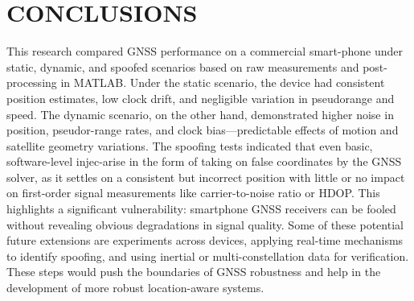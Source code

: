 
\section{CONCLUSIONS} \label{sec:conclusions}

    This research compared GNSS performance on a commercial smart-phone under static, dynamic, and spoofed scenarios based on raw measurements and post-processing in MATLAB. Under the static scenario, the device had consistent position estimates, low clock drift, and negligible variation in pseudorange and speed. The dynamic scenario, on the other hand, demonstrated higher noise in position, pseudor-range rates, and clock bias—predictable effects of motion and satellite geometry variations.
    The spoofing tests indicated that even basic, software-level injec-arise in the form of taking on false coordinates by the GNSS solver, as it settles on a consistent but incorrect position with little or no impact on first-order signal measurements like carrier-to-noise ratio or HDOP. This highlights a significant vulnerability: smartphone GNSS receivers can be fooled without revealing obvious degradations in signal quality. Some of these potential future extensions are experiments across devices, 
    applying real-time mechanisms to identify spoofing, and using inertial or multi-constellation data for verification. These steps would push the boundaries of GNSS robustness and help in the development of more robust location-aware systems.